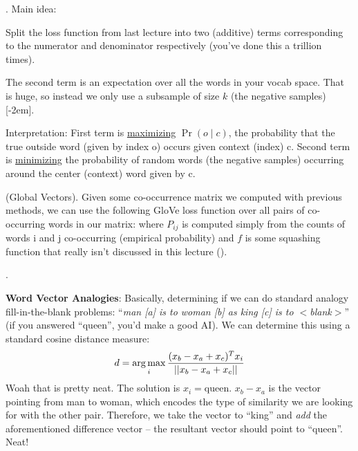 \documentclass[11pt]{article}
\newcommand\myspace[1][]{\vspace{#1\bigskipamount}}
\newcommand\p{\Needspace{10\baselineskip} \noindent}
\begin{document}
\p {}. Main idea: 
\begin{compactitem}
	\item Split the loss function from last lecture into two (additive) terms corresponding to the numerator and denominator respectively (you've done this a trillion times).
	\item The second term is an expectation over all the words in your vocab space. That is huge, so instead we only use a subsample of size $k$ (the negative samples)[-2em].
	\item Interpretation: First term is \underline{maximizing} $\Pr(o \mid c)$, the probability that the true outside word (given by index o) occurs given context (index) c. Second term is \underline{minimizing} the probability of random words (the negative samples) occurring around the center (context) word given by c.
\end{compactitem}

\myspace
\p {} (Global Vectors). Given some co-occurrence matrix we computed with previous methods, we can use the following GloVe loss function over all pairs of co-occurring words in our matrix:
where $P_{ij}$ is computed simply from the counts of words i and j co-occurring (empirical probability) and $f$ is some squashing function that really isn't discussed in this lecture ().

\myspace
\p {}. 
\begin{compactitem}
	\item \textbf{Word Vector Analogies}: Basically, determining if we can do standard analogy fill-in-the-blank problems: ``\textit{man [a] is to woman [b] as king [c] is to $<$blank$>$}'' (if you answered ``queen'', you'd make a good AI). We can determine this using a standard cosine distance measure:
	\begin{align}
	d = \operatorname*{arg\,max}_i \frac{(x_b - x_a + x_c)^T x_i}{ || x_b - x_a + x_c ||}
	\end{align}
	Woah that is pretty neat. The solution is $x_i = \text{queen}$. $x_b - x_a$ is the vector pointing from man to woman, which encodes the type of similarity we are looking for with the other pair. Therefore, we take the vector to ``king'' and \textit{add} the aforementioned difference vector -- the resultant vector should point to ``queen''. Neat!
\end{compactitem}
\end{document}
